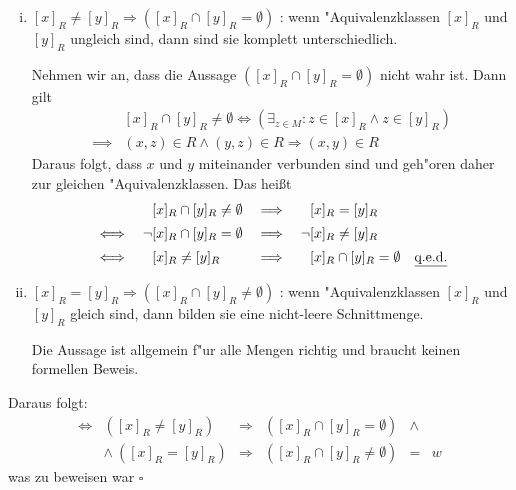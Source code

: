 \begin{enumerate}[i)]
    \item $[x]_R \neq [y]_R \Rightarrow ([x]_R \cap [y]_R = \emptyset)$ : wenn
        "Aquivalenzklassen $[x]_R$ und $[y]_R$ ungleich sind, dann sind sie
        komplett unterschiedlich.

        Nehmen wir an, dass die Aussage $([x]_R \cap [y]_R = \emptyset)$ nicht wahr ist.
        Dann gilt
        \begin{equation*}
            \begin{array}{rc}
                        &[x]_R \cap [y]_R \neq \emptyset \Leftrightarrow (\exists_{z \in M} : z \in [x]_R \land z \in [y]_R)  \\[5pt]
                \implies& (x, z) \in R \land (y, z) \in R \Rightarrow (x, y) \in R
            \end{array}
        \end{equation*}
        Daraus folgt, dass $x$ und $y$ miteinander verbunden sind und geh"oren
        daher zur gleichen "Aquivalenzklassen. Das hei{\ss}t
        \begin{equation*}
            \begin{array}{rlcl}
                      &\phantom{\lnot}[x]_R \cap [y]_R \neq \emptyset &\implies& \phantom{\lnot}[x]_R = [y]_R \\[5pt]
                \iff  &\lnot[x]_R \cap [y]_R =    \emptyset &\implies& \lnot[x]_R \neq [y]_R \\[5pt]
                \iff  &\phantom{\lnot}[x]_R \neq [y]_R                &\implies& \phantom{\lnot}[x]_R \cap [y]_R =    \emptyset \quad \text{\underline{q.e.d.}}
            \end{array}
        \end{equation*}
    \item $[x]_R = [y]_R \Rightarrow ([x]_R \cap [y]_R \neq \emptyset)$ : wenn
        "Aquivalenzklassen $[x]_R$ und $[y]_R$ gleich sind, dann bilden sie
        eine nicht-leere Schnittmenge.

        Die Aussage ist allgemein f"ur alle Mengen richtig und braucht keinen
        formellen Beweis.
\end{enumerate}

Daraus folgt:
\begin{equation*}
    \begin{array}{rrcrcl}
        \iff             &([x]_R \neq [y]_R) &\Rightarrow& ([x]_R \cap [y]_R    = \emptyset) &\land& \\[5pt]
                  &\land\ ([x]_R = [y]_R)    &\Rightarrow& ([x]_R \cap [y]_R \neq \emptyset) &=& w
     \end{array}
\end{equation*}
was zu beweisen war $\square$
